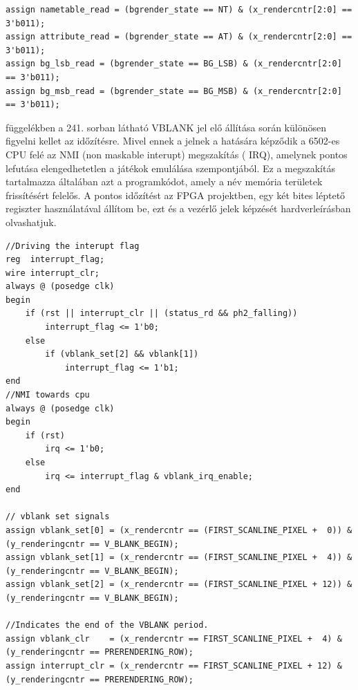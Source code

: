 \begin{lstlisting}[caption={Az állapotgép alapján az adatok mentét vezérlő jelek}, label={code:saving-from-PPU Databus}, style=prettyverilog]
assign nametable_read = (bgrender_state == NT) & (x_rendercntr[2:0] == 3'b011);
assign attribute_read = (bgrender_state == AT) & (x_rendercntr[2:0] == 3'b011);
assign bg_lsb_read = (bgrender_state == BG_LSB) & (x_rendercntr[2:0] == 3'b011);
assign bg_msb_read = (bgrender_state == BG_MSB) & (x_rendercntr[2:0] == 3'b011);\end{lstlisting}
	
	 függelékben a 241. sorban látható VBLANK jel elő állítása során különösen figyelni kellet az időzítésre. Mivel ennek a jelnek a hatására képződik a 6502-es CPU felé az NMI (non maskable interupt) megszakítás ( IRQ), amelynek pontos lefutása elengedhetetlen a játékok emulálása szempontjából. Ez a megszakítás tartalmazza általában azt a programkódot, amely a név memória területek frissítésért felelős. A pontos időzítést az FPGA projektben, egy két bites léptető regiszter használatával állítom be, ezt és a vezérlő jelek képzését  hardverleírásban olvashatjuk.       
		
\begin{lstlisting}[caption={VBLANK vezérlőjelek képzése és az NMI (IRQ) jel előállítása}, label={code:vblank-set}, style=prettyverilog]
//Driving the interupt flag
reg  interrupt_flag;
wire interrupt_clr;
always @ (posedge clk) 
begin
	if (rst || interrupt_clr || (status_rd && ph2_falling))
		interrupt_flag <= 1'b0;
	else
		if (vblank_set[2] && vblank[1])
			interrupt_flag <= 1'b1;
end
//NMI towards cpu
always @ (posedge clk) 
begin
	if (rst)
		irq <= 1'b0;
	else
		irq <= interrupt_flag & vblank_irq_enable; 
end
	
// vblank set signals
assign vblank_set[0] = (x_rendercntr == (FIRST_SCANLINE_PIXEL +  0)) & (y_renderingcntr == V_BLANK_BEGIN);
assign vblank_set[1] = (x_rendercntr == (FIRST_SCANLINE_PIXEL +  4)) & (y_renderingcntr == V_BLANK_BEGIN);
assign vblank_set[2] = (x_rendercntr == (FIRST_SCANLINE_PIXEL + 12)) & (y_renderingcntr == V_BLANK_BEGIN);

//Indicates the end of the VBLANK period.
assign vblank_clr    = (x_rendercntr == FIRST_SCANLINE_PIXEL +  4) & (y_renderingcntr == PRERENDERING_ROW);
assign interrupt_clr = (x_rendercntr == FIRST_SCANLINE_PIXEL + 12) & (y_renderingcntr == PRERENDERING_ROW);\end{lstlisting}
	
